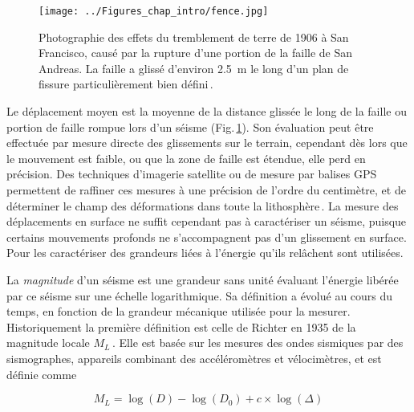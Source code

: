 \begin{figure}[htb]
\centering
\texttt{[image: ../Figures\_chap\_intro/fence.jpg]}
\caption[Observation directe du glissement dû à un séisme]{Photographie des effets du tremblement de terre de 1906 à San Francisco, causé par la rupture d'une portion de la faille de San Andreas. La faille a glissé d'environ \SI{2.5}{\meter} le long d'un plan de fissure particulièrement bien défini\,\cite{reid_mechanics_1910}.}
\label{fig:fence}
\end{figure}

Le déplacement moyen est la moyenne de la distance glissée le long de la faille ou portion de faille rompue lors d'un séisme (Fig.\,\ref{fig:fence}). Son évaluation peut être effectuée par mesure directe des glissements sur le terrain, cependant dès lors que le mouvement est faible, ou que la zone de faille est étendue, elle perd en précision. Des techniques d'imagerie satellite ou de mesure par balises GPS permettent de raffiner ces mesures à une précision de l'ordre du centimètre, et de déterminer le champ des déformations dans toute la lithosphère\,\cite{michel_measuring_1999,segall_gps_1997,pagani_quantification_2021}. La mesure des déplacements en surface ne suffit cependant pas à caractériser un séisme, puisque certains mouvements profonds ne s'accompagnent pas d'un glissement en surface. Pour les caractériser des grandeurs liées à l'énergie qu'ils relâchent sont utilisées.



La \textit{magnitude} d'un séisme est une grandeur sans unité évaluant l'énergie libérée par ce séisme sur une échelle logarithmique. Sa définition a évolué au cours du temps, en fonction de la grandeur mécanique utilisée pour la mesurer. Historiquement la première définition est celle de Richter en 1935 de la magnitude locale $M_L$\,\cite{richter_instrumental_1935}. Elle est basée sur les mesures des ondes sismiques par des sismographes, appareils combinant des accéléromètres et vélocimètres, et est définie comme

\begin{equation}
M_L=\log(D)-\log(D_0)+c\times\log(\Delta)
\end{equation}

